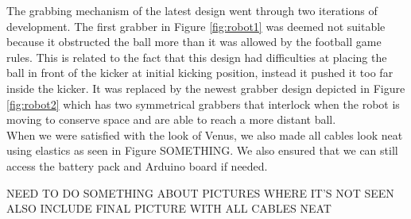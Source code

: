 \documentclass[12pt]{article}
\begin{document}
The grabbing mechanism of the latest design went through two iterations of development.
The first grabber in Figure \ref{fig:robot1} was deemed not suitable because it obstructed the ball more than it was allowed by the football game rules. This is related to the fact that this design had difficulties at placing the ball in front of the kicker at initial kicking position, instead it pushed it
too far inside the kicker. It was replaced by the newest grabber design depicted in Figure \ref{fig:robot2} which has two symmetrical grabbers that interlock when the robot is moving to conserve space and are able to reach a more distant ball.
\\When we were satisfied with the look of Venus, we also made all cables look neat using elastics as seen in Figure SOMETHING. We also ensured that we can still access the battery pack and Arduino board if needed.

NEED TO DO SOMETHING ABOUT PICTURES WHERE IT'S NOT SEEN 
ALSO INCLUDE FINAL PICTURE WITH ALL CABLES NEAT
\end{document}
